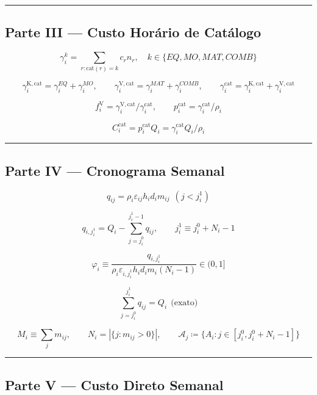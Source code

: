 \documentclass[
  10pt,
]{article}
\begin{document}
\begin{center}\rule{0.5\linewidth}{0.5pt}\end{center}

\hypertarget{parte-iii-custo-horuxe1rio-de-catuxe1logo}{%
\subsection{Parte III --- Custo Horário de
Catálogo}\label{parte-iii-custo-horuxe1rio-de-catuxe1logo}}

\[\gamma_i^{k} = \sum_{r:\text{cat}(r)=k}c_r n_r,\quad k\in\{EQ,MO,MAT,COMB\}\]

\[\gamma_i^{\mathrm{K,cat}}=\gamma_i^{EQ}+\gamma_i^{MO},\qquad \gamma_i^{\mathrm{V,cat}}=\gamma_i^{MAT}+\gamma_i^{COMB},\qquad \gamma_i^{\mathrm{cat}}=\gamma_i^{\mathrm{K,cat}}+\gamma_i^{\mathrm{V,cat}}\]

\[f_i^{\mathrm V}=\gamma_i^{\mathrm{V,cat}}/\gamma_i^{\mathrm{cat}}, \qquad p_i^{\mathrm{cat}}=\gamma_i^{\mathrm{cat}}/\rho_i\]

\[\boxed{C_i^{\mathrm{cat}} = p_i^{\mathrm{cat}}Q_i = \gamma_i^{\mathrm{cat}}Q_i/\rho_i}\]

\begin{center}\rule{0.5\linewidth}{0.5pt}\end{center}

\hypertarget{parte-iv-cronograma-semanal}{%
\subsection{Parte IV --- Cronograma
Semanal}\label{parte-iv-cronograma-semanal}}

\[q_{ij}=\rho_i\varepsilon_{ij}h_id_im_{ij}\ \ (j<j_i^1)\]

\[q_{i,j_i^1} = Q_i-\sum_{j=j_i^0}^{j_i^1-1}q_{ij}, \qquad j_i^1\equiv j_i^0+N_i-1\]

\[\boxed{\varphi_i \equiv \frac{q_{i,j_i^1}}{\rho_i\varepsilon_{i,j_i^1}h_id_im_i(N_i-1)}\in(0,1]}\]

\[\boxed{\sum_{j=j_i^0}^{j_i^1}q_{ij}=Q_i}\ \ \text{(exato)}\]

\[M_i\equiv\sum_jm_{ij}, \qquad N_i=|\{j:m_{ij}>0\}|, \qquad \mathcal{A}_j\coloneqq\{A_i:j\in[j_i^0,j_i^0+N_i-1]\}\]

\begin{center}\rule{0.5\linewidth}{0.5pt}\end{center}

\hypertarget{parte-v-custo-direto-semanal}{%
\subsection{Parte V --- Custo Direto
Semanal}\label{parte-v-custo-direto-semanal}}
\end{document}
